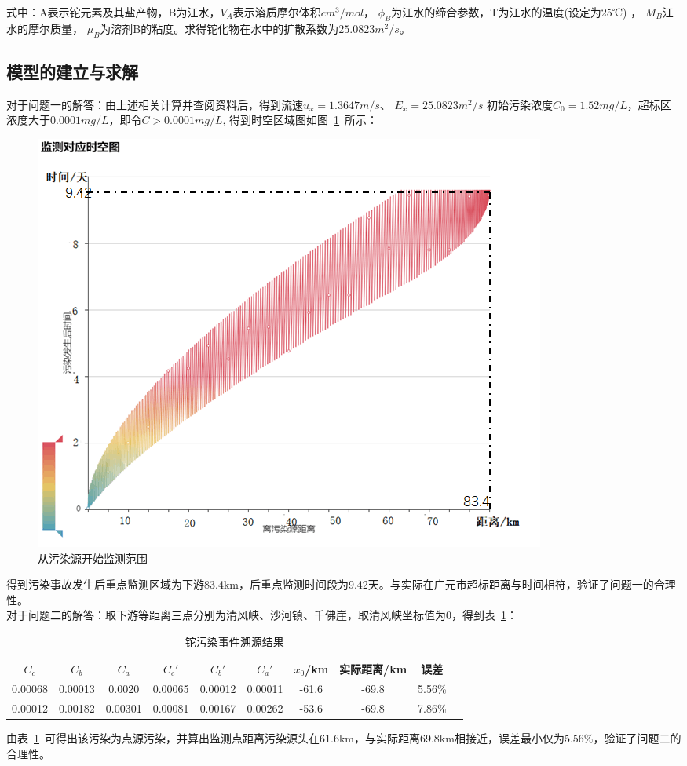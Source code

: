 \documentclass{whutmod}
\begin{document}
	式中：A表示铊元素及其盐产物，B为江水，$V_{A}$表示溶质摩尔体积$cm^{3}/mol$， 
	$\phi_{B}$为江水的缔合参数，T为江水的温度(设定为25℃) ，
	$M_{B}$江水的摩尔质量，
	$\mu_{B}$为溶剂B的粘度。求得铊化物在水中的扩散系数为$25.0823m^{2}/s$。
	\subsection{模型的建立与求解}
对于问题一的解答：由上述相关计算并查阅资料后，得到流速$u_{x}=1.3647m/s$、 $E_{x}=25.0823m^{2}/s$ 初始污染浓度$C_{0}=1.52mg/L$，超标区浓度大于$0.0001mg/L$，即令$C>0.0001mg/L$, 得到时空区域图如图~\ref{skfbt}~所示：
\begin{figure}[H]
	\centering
	\includegraphics[width=.8\textwidth]{figures/zaojiatu.png}
	\caption{从污染源开始监测范围}\label{skfbt}
\end{figure}
得到污染事故发生后重点监测区域为下游83.4km，后重点监测时间段为9.42天。与实际在广元市超标距离与时间相符，验证了问题一的合理性。
~\\

对于问题二的解答：取下游等距离三点分别为清风峡、沙河镇、千佛崖，取清风峡坐标值为0，得到表~\ref{zzz}：
	\begin{table}[H]
	\caption{铊污染事件溯源结果}\label{zzz} \centering
	\begin{tabular}{cccccccccc}
		\toprule[1.5pt]
		$C_{c}$& $C_{b}$ & $C_{a}$ &${C_{c}}'$ & ${C_{b}}'$&${C_{a}}'$&$x_{0}$/km&实际距离/km& 误差\\
		\midrule[1pt]
		0.00068&0.00013 &0.0020&0.00065&0.00012&0.00011&-61.6&-69.8&5.56\%\\
		0.00012& 0.00182 &0.00301&0.00081&0.00167&0.00262&-53.6&-69.8&7.86\%\\
		\bottomrule[1.5pt]
	\end{tabular}
\end{table}
由表~\ref{zzz}~可得出该污染为点源污染，并算出监测点距离污染源头在61.6km，与实际距离69.8km相接近，误差最小仅为5.56\%，验证了问题二的合理性。
\end{document}
